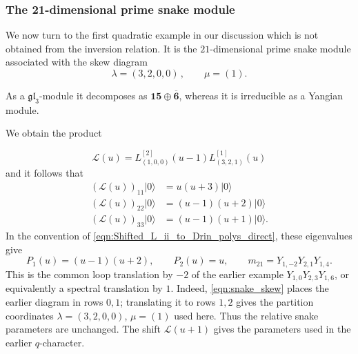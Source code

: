 \documentclass[12pt,reqno]{amsart}
\numberwithin{equation}{section}
\begin{document}
\subsubsection{The 21-dimensional prime snake module}
\label{subsubsec:21dim_GT}
We now turn to the first quadratic example in our discussion which is not
obtained from the inversion relation. It is the $21$-dimensional prime snake
module associated with the skew diagram
\begin{equation}
 \lambda=(3,2,0,0)\,,\qquad \mu=(1).
\end{equation}
\begin{center}
\end{center}
As a $\mathfrak{gl}_3$-module it decomposes as
$\mathbf{15}\oplus\overline{\mathbf{6}}$, whereas it is irreducible as a
Yangian module.

We obtain the product

\begin{equation}
 \mathcal{L}(u)=L^{[2]}_{(1,0,0)}(u-1) L^{[1]}_{(3,2,1)}(u)
 \label{eqn:21_GT_product}
\end{equation}
and it follows that
\begin{align}
 ( \mathcal{L}(u))_{11}|0\rangle &=u(u+3)|0\rangle\\
 (  \mathcal{L}(u))_{22}|0\rangle &=(u-1)(u+2)|0\rangle\\
  ( \mathcal{L}(u))_{33}|0\rangle &=(u-1)(u+1)|0\rangle.
\end{align}
In the convention of \eqref{eqn:Shifted_L_ii_to_Drin_polys_direct},
these eigenvalues give
\begin{equation}
    P_1(u)=(u-1)(u+2),\qquad P_2(u)=u,
    \qquad m_{21}=Y_{1,-2}Y_{2,1}Y_{1,4}.
    \label{eqn:21_Drinfeld_loop_origin}
\end{equation}
This is the common loop translation by $-2$ of the earlier example
$Y_{1,0}Y_{2,3}Y_{1,6}$, or equivalently a spectral translation by $1$.
Indeed, \eqref{eqn:snake_skew} places the earlier diagram in rows $0,1$;
translating it to rows $1,2$ gives the partition coordinates
$\lambda=(3,2,0,0)$, $\mu=(1)$ used here. Thus the relative snake
parameters are unchanged. The shift $\mathcal L(u+1)$ gives the parameters
used in the earlier $q$-character.
\end{document}
